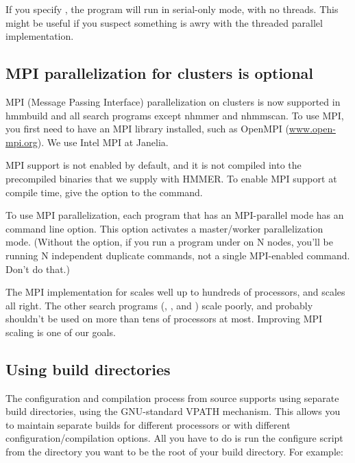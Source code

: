 If you specify , the program will run in serial-only
mode, with no threads. This might be useful if you suspect something
is awry with the threaded parallel implementation.

\subsection{MPI parallelization for clusters is optional}

MPI (Message Passing Interface) parallelization on clusters is now
supported in hmmbuild and all search programs except nhmmer and 
nhmmscan. To use MPI, you first need to have an MPI library installed, 
such as OpenMPI (\url{www.open-mpi.org}). We use Intel MPI at Janelia.

MPI support is not enabled by default, and it is not compiled into the
precompiled binaries that we supply with HMMER. To enable MPI support
at compile time, give the  option to the
 command.

To use MPI parallelization, each program that has an MPI-parallel mode
has an  command line option. This option activates a
master/worker parallelization mode. (Without the  option,
if you run a program under  on N nodes, you'll be
running N independent duplicate commands, not a single MPI-enabled
command. Don't do that.)

The MPI implementation for  scales well up to hundreds
of processors, and  scales all right. The other search
programs (, , and ) scale
poorly, and probably shouldn't be used on more than tens of processors
at most. Improving MPI scaling is one of our goals.


\subsection{Using build directories}

The configuration and compilation process from source supports using
separate build directories, using the GNU-standard VPATH
mechanism. This allows you to maintain separate builds for different
processors or with different configuration/compilation options. All
you have to do is run the configure script from the directory you want
to be the root of your build directory.  For example:

\\
\\
\\

